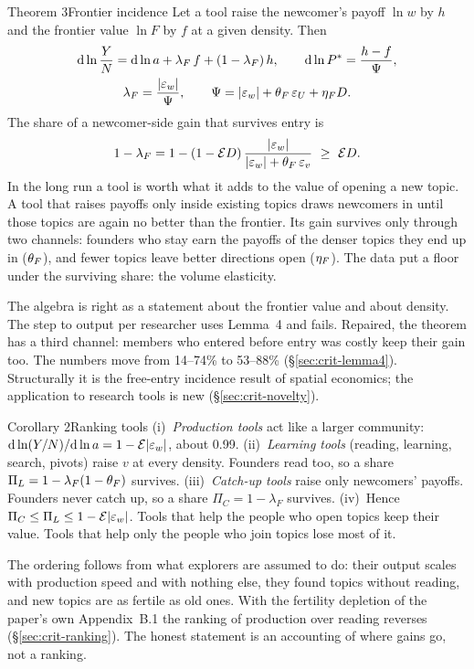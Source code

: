 \begin{resultbox}{Theorem 3}{Frontier incidence}{\trepair}
Let a tool raise the newcomer's payoff $\ln w$ by $h$ and the frontier value $\ln F$ by $f$ at a given density. Then
\begin{gather*}
\mathrm{d}\ln\frac{Y}{N}=\mathrm{d}\ln a+\lambda_F\,f+(1-\lambda_F)\,h,\qquad
\mathrm{d}\ln P^*=\frac{h-f}{\Psi},\\
\lambda_F=\frac{|\varepsilon_w|}{\Psi},\qquad \Psi=|\varepsilon_w|+\theta_F\,\varepsilon_U+\eta_F D .
\end{gather*}
The share of a newcomer-side gain that survives entry is
\[
1-\lambda_F=1-(1-\mathcal{E} D)\,\frac{|\varepsilon_w|}{|\varepsilon_w|+\theta_F\,\varepsilon_v}\ \ge\ \mathcal{E} D .
\]
\tcblower
\inwords In the long run a tool is worth what it adds to the value of opening a new topic. A tool that raises payoffs only inside existing topics draws newcomers in until those topics are again no better than the frontier. Its gain survives only through two channels: founders who stay earn the payoffs of the denser topics they end up in ($\theta_F$), and fewer topics leave better directions open ($\eta_F$). The data put a floor under the surviving share: the volume elasticity.

\review The algebra is right as a statement about the frontier value and about density. The step to output per researcher uses Lemma~4 and fails. Repaired, the theorem has a third channel: members who entered before entry was costly keep their gain too. The numbers move from 14--74\% to 53--88\% (\S\ref{sec:crit-lemma4}). Structurally it is the free-entry incidence result of spatial economics; the application to research tools is new (\S\ref{sec:crit-novelty}).
\end{resultbox}

\begin{resultbox}{Corollary 2}{Ranking tools}{\tassumed}
(i)~\emph{Production tools} act like a larger community: $\mathrm{d}\ln(Y/N)/\mathrm{d}\ln a=1-\mathcal{E}|\varepsilon_w|$, about 0.99.
(ii)~\emph{Learning tools} (reading, learning, search, pivots) raise $v$ at every density. Founders read too, so a share $\Pi_L=1-\lambda_F(1-\theta_F)$ survives.
(iii)~\emph{Catch-up tools} raise only newcomers' payoffs. Founders never catch up, so a share $\Pi_C=1-\lambda_F$ survives.
(iv)~Hence $\Pi_C\le\Pi_L\le 1-\mathcal{E}|\varepsilon_w|$.
\tcblower
\inwords Tools that help the people who open topics keep their value. Tools that help only the people who join topics lose most of it.

\review The ordering follows from what explorers are assumed to do: their output scales with production speed and with nothing else, they found topics without reading, and new topics are as fertile as old ones. With the fertility depletion of the paper's own Appendix~B.1 the ranking of production over reading reverses (\S\ref{sec:crit-ranking}). The honest statement is an accounting of where gains go, not a ranking.
\end{resultbox}

